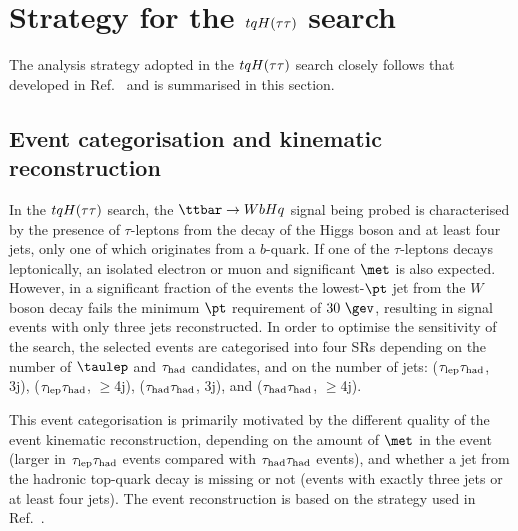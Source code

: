 \section{Strategy for the $tqH(\tau\tau)$ search}
\label{sec:strategy_Htautau}

The analysis strategy adopted in the $tqH(\tau\tau)$ search closely follows that developed in Ref.~\cite{Chen:2015nta} and is summarised in this section.

\subsection{Event categorisation and kinematic reconstruction}
\label{sec:htautau_reco_cat}

In the $tqH(\tau\tau)$ search, the $\ttbar \to WbHq$ signal being probed is characterised by the presence of $\tau$-leptons from the decay of 
the Higgs boson and at least four jets, only one of which originates from a $b$-quark.
If one of the $\tau$-leptons decays leptonically, an isolated electron or muon and significant $\met$ is also expected.
However, in a significant fraction of the events the lowest-$\pt$ jet from the $W$ boson decay fails the minimum $\pt$ requirement of $30~\gev$,
resulting in signal events with only three jets reconstructed.
In order to optimise the sensitivity of the search, the selected events are categorised into four SRs depending 
on the number of $\taulep$ and $\tau_{\mathrm{had}}$ candidates, and on the number of jets:
($\tau_{\mathrm{lep}} \tau_{\mathrm{had}}$, 3j), ($\tau_{\mathrm{lep}} \tau_{\mathrm{had}}$, $\geq$4j), ($\tau_{\mathrm{had}} \tau_{\mathrm{had}}$, 3j), and ($\tau_{\mathrm{had}} \tau_{\mathrm{had}}$, $\geq$4j). 

This event categorisation is primarily motivated by the different quality of the event kinematic reconstruction, depending on the amount 
of $\met$ in the event (larger in $\tau_{\mathrm{lep}} \tau_{\mathrm{had}}$ events compared with $\tau_{\mathrm{had}} \tau_{\mathrm{had}}$ events), and whether a jet from the hadronic top-quark decay 
is missing or not (events with exactly three jets or at least four jets).
The event reconstruction is based on the strategy used in Ref.~\cite{Chen:2015nta}.

